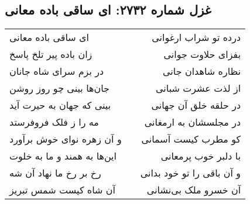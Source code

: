 \begin{center}
\section*{غزل شماره ۲۷۳۲: ای ساقی باده معانی}
\label{sec:2732}
\begin{longtable}{l p{0.5cm} r}
ای ساقی باده معانی
&&
درده تو شراب ارغوانی
\\
زان باده پیر تلخ پاسخ
&&
بفزای حلاوت جوانی
\\
در بزم سرای شاه جانان
&&
نظاره شاهدان جانی
\\
جان‌ها بینی چو روز روشن
&&
از لذت عشرت شبانی
\\
بینی که جهان به حیرت آید
&&
در حلقه خلق آن جهانی
\\
مه را ز فلک فروفرستد
&&
در مجلسشان به ارمغانی
\\
و آن زهره نوای خوش برآورد
&&
کو مطرب کیست آسمانی
\\
این‌ها به همند و ما به خلوت
&&
با دلبر خوب پرمعانی
\\
رخ بر رخ ما نهاد آن شه
&&
و آن باقی را تو خود بدانی
\\
آن شاه کیست شمس تبریز
&&
آن خسرو ملک بی‌نشانی
\\
\end{longtable}
\end{center}

